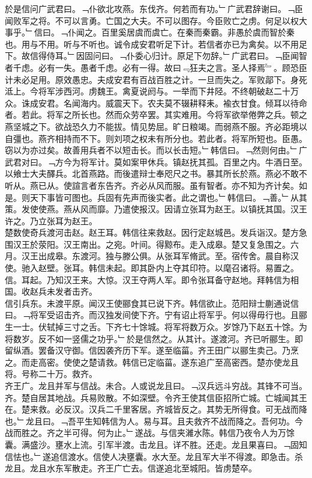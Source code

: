 \documentclass{zhvt-classic}
\begin{document}
\hspace*{2em}於是信问广武君曰。﹁仆欲北攻燕。东伐齐。何若而有功。﹂广武君辞谢曰。﹁臣闻败军之将。不可以言勇。亡国之大夫。不可以图存。今臣败亡之虏。何足以权大事乎。﹂信曰。﹁仆闻之。百里奚居虞而虞亡。在秦而秦霸。非愚於虞而智於秦也。用与不用。听与不听也。诚令成安君听足下计。若信者亦已为禽矣。以不用足下。故信得侍耳。﹂因固问曰。﹁仆委心归计。原足下勿辞。﹂广武君曰。﹁臣闻智者千虑。必有一失。愚者千虑。必有一得。故曰﹃狂夫之言。圣人择焉﹄。顾恐臣计未必足用。原效愚忠。夫成安君有百战百胜之计。一旦而失之。军败鄗下。身死泜上。今将军涉西河。虏魏王。禽夏说阏与。一举而下井陉。不终朝破赵二十万众。诛成安君。名闻海内。威震天下。农夫莫不辍耕释耒。褕衣甘食。倾耳以待命者。若此。将军之所长也。然而众劳卒罢。其实难用。今将军欲举倦弊之兵。顿之燕坚城之下。欲战恐久力不能拔。情见势屈。旷日粮竭。而弱燕不服。齐必距境以自彊也。燕齐相持而不下。则刘项之权未有所分也。若此者。将军所短也。臣愚。窃以为亦过矣。故善用兵者不以短击长。而以长击短。﹂韩信曰。﹁然则何由。﹂广武君对曰。﹁方今为将军计。莫如案甲休兵。镇赵抚其孤。百里之内。牛酒日至。以飨士大夫醳兵。北首燕路。而後遣辩士奉咫尺之书。暴其所长於燕。燕必不敢不听从。燕已从。使諠言者东告齐。齐必从风而服。虽有智者。亦不知为齐计矣。如是。则天下事皆可图也。兵固有先声而後实者。此之谓也。﹂韩信曰。﹁善。﹂从其策。发使使燕。燕从风而靡。乃遣使报汉。因请立张耳为赵王。以镇抚其国。汉王许之。乃立张耳为赵王。\\
\hspace*{2em}楚数使奇兵渡河击赵。赵王耳。韩信往来救赵。因行定赵城邑。发兵诣汉。楚方急围汉王於荥阳。汉王南出。之宛。叶间。得黥布。走入成皋。楚又复急围之。六月。汉王出成皋。东渡河。独与滕公俱。从张耳军脩武。至。宿传舍。晨自称汉使。驰入赵壁。张耳。韩信未起。即其卧内上夺其印符。以麾召诸将。易置之。信。耳起。乃知汉王来。大惊。汉王夺两人军。即令张耳备守赵地。拜韩信为相国。收赵兵未发者击齐。\\
\hspace*{2em}信引兵东。未渡平原。闻汉王使郦食其已说下齐。韩信欲止。范阳辩士蒯通说信曰。﹁将军受诏击齐。而汉独发间使下齐。宁有诏止将军乎。何以得毋行也。且郦生一士。伏轼掉三寸之舌。下齐七十馀城。将军将数万众。岁馀乃下赵五十馀。为将数岁。反不如一竖儒之功乎。﹂於是信然之。从其计。遂渡河。齐已听郦生。即留纵酒。罢备汉守御。信因袭齐历下军。遂至临菑。齐王田广以郦生卖己。乃烹之。而走高密。使使之楚请救。韩信已定临菑。遂东追广至高密西。楚亦使龙且将。号称二十万。救齐。\\
\hspace*{2em}齐王广。龙且并军与信战。未合。人或说龙且曰。﹁汉兵远斗穷战。其锋不可当。齐。楚自居其地战。兵易败散。不如深壁。令齐王使其信臣招所亡城。亡城闻其王在。楚来救。必反汉。汉兵二千里客居。齐城皆反之。其势无所得食。可无战而降也。﹂龙且曰。﹁吾平生知韩信为人。易与耳。且夫救齐不战而降之。吾何功。今战而胜之。齐之半可得。何为止。﹂遂战。与信夹濰水陈。韩信乃夜令人为万馀囊。满盛沙。壅水上流。引军半渡。击龙且。详不胜。还走。龙且果喜曰。﹁固知信怯也。﹂遂追信渡水。信使人决壅囊。水大至。龙且军大半不得渡。即急击。杀龙且。龙且水东军散走。齐王广亡去。信遂追北至城阳。皆虏楚卒。\\
\end{document}
